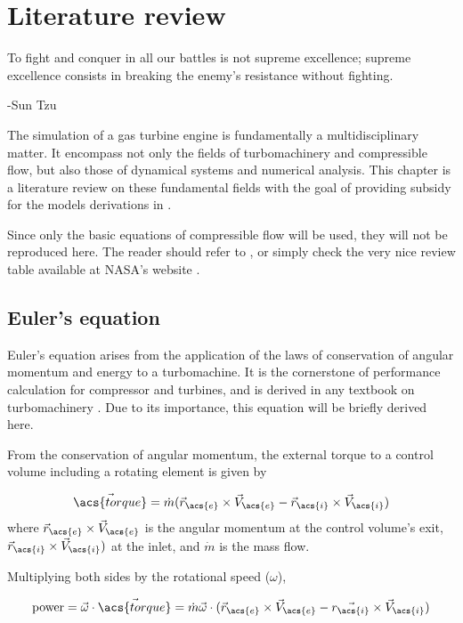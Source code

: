 \chapter{Literature review}
\label{sec:review}
\epigraph{To fight and conquer in all our battles is not supreme excellence; supreme excellence consists in breaking the enemy's resistance without fighting.}{-Sun Tzu}

The simulation of a gas turbine engine is fundamentally a multidisciplinary matter.
It encompass not only the fields of turbomachinery and compressible flow, 
but also those of dynamical systems and numerical analysis.
This chapter is a literature review on these fundamental fields with the goal of 
providing subsidy for the models derivations in .

Since only the basic equations of compressible flow will be used, they will not be reproduced here. 
The reader should refer to \textcite{Anderson, Shapiro}, 
or simply check the very nice review table available at NASA's website \cite{nasa_isentropic}.

\section{Euler's equation}
\label{sec:euler_equation}
Euler's equation arises from the application of the laws of conservation of angular momentum and energy to a turbomachine. It is the cornerstone of performance calculation for compressor and turbines, and is derived in any textbook on turbomachinery \cite{Lakshminarayana1996, Dixon1998, Schobeiri2004, Hill1991, Logan2003, Baskharone2006}. Due to its importance, this equation will be briefly derived here.

From the conservation of angular momentum, the external torque to a control volume including a rotating element is given by 

\begin{equation}
    \vec{\acs{torque}} = \dot{m} (\vec{r}_{\acs{e}}\cross\vec{V}_{\acs{e}} - \vec{r}_{\acs{i}}\cross\vec{V}_{\acs{i}}) 
\end{equation}
where $\vec{r}_{\acs{e}}\cross\vec{V}_{\acs{e}}$ is the angular momentum at the control volume's exit, 
$\vec{r}_{\acs{i}}\cross\vec{V}_{\acs{i}})$ at the inlet, and $\dot{m}$ is the mass flow.

Multiplying both sides by the rotational speed ($\omega$),

\begin{equation}
    \text{power} = \vec{\omega}\cdot\vec{\acs{torque}} 
                = \dot{m} \vec{\omega} \cdot (\vec{r}_{\acs{e}}\cross\vec{V}_{\acs{e}} - \vec{r_{\acs{i}}}\cross\vec{V}_{\acs{i}}) 
\end{equation}

